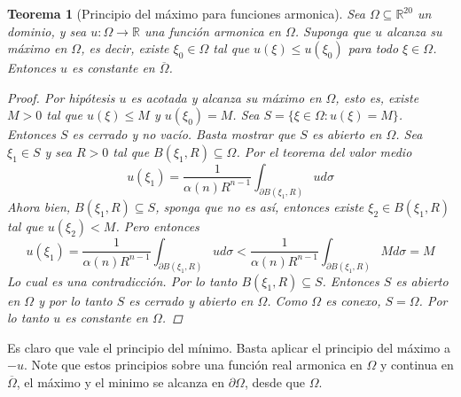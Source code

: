 \documentclass[11pt]{book}
\theoremstyle{plain}
\newtheorem{teo}[proposición]{Teorema}
\theoremstyle{definition}
\newcommand{\R}{\mathbb{R}}
\begin{document}
    \begin{teo}[Principio del máximo para funciones armonica]
        Sea $\Omega \subseteq \R^{20}$ un dominio, y sea $u: \Omega\to\R$ una función armonica en $\Omega$. Suponga que $u$ alcanza su máximo en $\Omega$, es decir, existe $\xi_{0} \in\Omega$ tal que $u(\xi) \leq u(\xi_{0})$ para todo $\xi \in \Omega$. Entonces $u$ es constante en $\overline{\Omega}$.
        \begin{proof}
            Por hipótesis $u$ es acotada y alcanza su máximo en $\Omega$, esto es, existe $M > 0$ tal que $u(\xi) \leq M$ y $u(\xi_{0}) = M$. Sea $S = \{\xi\in \Omega : u(\xi) = M\}$. Entonces $S$ es cerrado y no vacío. Basta mostrar que $S$ es abierto en $\Omega$. Sea $\xi_{1} \in S$ y sea $R > 0$ tal que $B(\xi_{1}, R) \subseteq \Omega$. Por el teorema del valor medio
            \[
                u(\xi_{1}) = \frac{1}{\alpha(n)R^{n-1}}\int_{\partial B(\xi_{1},R)} u d\sigma
            \]
            Ahora bien, $B(\xi_{1}, R) \subseteq S$, sponga que no es así, entonces existe $\xi_{2} \in B(\xi_{1}, R)$ tal que $u(\xi_{2}) < M$. Pero entonces
            \[
                u(\xi_{1}) = \frac{1}{\alpha(n)R^{n-1}}\int_{\partial B(\xi_{1},R)} u d\sigma < \frac{1}{\alpha(n)R^{n-1}}\int_{\partial B(\xi_{1},R)} M d\sigma = M
            \]
            Lo cual es una contradicción. Por lo tanto $B(\xi_{1}, R) \subseteq S$. Entonces $S$ es abierto en $\Omega$ y por lo tanto $S$ es cerrado y abierto en $\Omega$. Como $\Omega$ es conexo, $S = \Omega$. Por lo tanto $u$ es constante en $\Omega$.
        \end{proof}
    \end{teo}
    Es claro que vale el principio del mínimo. Basta aplicar el principio del máximo a $-u$. Note que estos principios sobre una función real armonica en $\Omega$ y continua en $\overline{\Omega}$, el máximo y el minimo se alcanza en $\partial \Omega$, desde que $\Omega$. 
\end{document}
